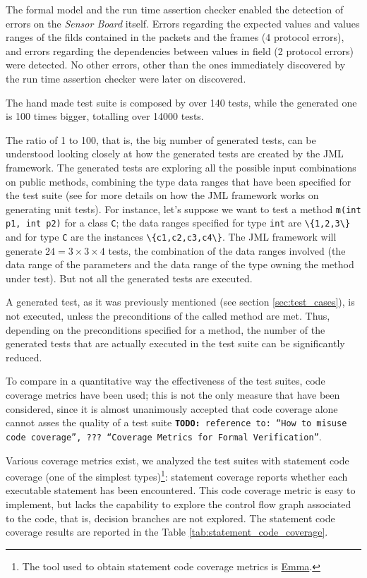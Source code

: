 \documentclass{article} \usepackage{times}
\newcommand{\myhref}[2]{\ifpdf\href{#1}{#2}\else\htmladdnormallinkfoot{#2}{#1}\fi}
\newcommand{\lil}[1]{\texttt{\lstinline|#1|}}
\newcommand{\todo}[1]{\texttt{\textbf{TODO:} #1}}
\newcommand{\SB}{\emph{Sensor Board}\xspace}
\begin{document}
The formal model and the run time assertion checker enabled the
detection of errors on the \SB itself.  Errors regarding the expected
values and values ranges of the filds contained in the packets and the
frames (4 protocol errors), and errors regarding the dependencies
between values in field (2 protocol errors) were detected. No other
errors, other than the ones immediately discovered by the run time
assertion checker were later on discovered.

The hand made test suite is composed by over 140 tests, while the
generated one is 100 times bigger, totalling over 14000 tests.

The ratio of 1 to 100, that is, the big number of generated tests, can
be understood looking closely at how the generated tests are created
by the JML framework. The generated tests are exploring all the
possible input combinations on public methods, combining the type data
ranges that have been specified for the test suite (see
\cite{Cheon-Leavens02} for more details on how the JML framework works
on generating unit tests). For instance, let's suppose we want to test
a method \lil{m(int p1, int p2)} for a class \lil{C}; the data ranges
specified for type \lil{int} are \lil{\{1,2,3\}} and for type \lil{C}
are the instances \lil{\{c1,c2,c3,c4\}}. The JML framework will
generate $24 = 3 \times 3 \times 4$ tests, the combination of the data
ranges involved (the data range of the parameters and the data range
of the type owning the method under test). But not all the generated
tests are executed.

A generated test, as it was previously mentioned (see section
\ref{sec:test_cases}), is not executed, unless the preconditions of
the called method are met. Thus, depending on the preconditions
specified for a method, the number of the generated tests that are
actually executed in the test suite can be significantly reduced.

To compare in a quantitative way the effectiveness of the test suites,
code coverage metrics have been used; this is not the only measure
that have been considered, since it is almost unanimously accepted
that code coverage alone cannot asses the quality of a test suite
\todo{reference to: ``How to misuse code coverage'', ??? ``Coverage
  Metrics for Formal Verification''}.

Various coverage metrics exist, we analyzed the test suites with
statement code coverage (one of the simplest types)\footnote{The tool
  used to obtain statement code coverage metrics is
  \myhref{http://emma.sourceforge.net/}{Emma}.}: statement coverage
reports whether each executable statement has been encountered. This
code coverage metric is easy to implement, but lacks the capability to
explore the control flow graph associated to the code, that is,
decision branches are not explored. The statement code coverage
results are reported in the Table \ref{tab:statement_code_coverage}.
\end{document}
